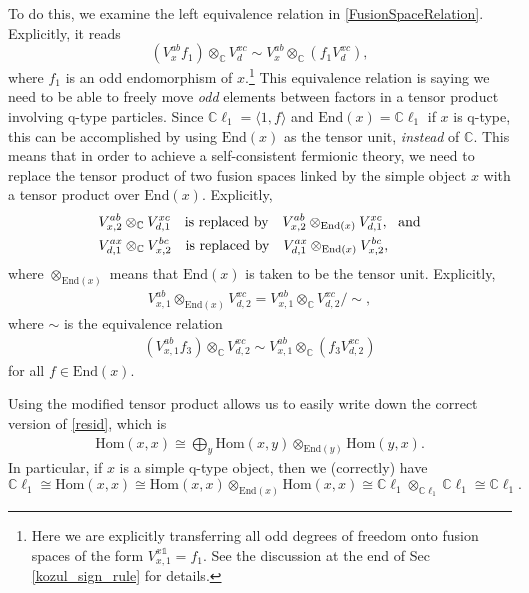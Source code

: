 \documentclass[12pt,a4paper]{article}
\newcommand{\tp}{\otimes}
\newcommand{\unit}{\mathds{1}}
\newcommand{\cc}{\mathbb{C}}
\newcommand\be            {\begin{equation}}
\newcommand\ee            {\end{equation}}
\newcommand\ba            {\begin{aligned}}
\newcommand\ea            {\end{aligned}}
\newcommand{\Hom}{\text{Hom}}
\newcommand{\End}{\text{End}}
\newcommand{\cl}{\mathbb{C}\ell}
\begin{document}
To do this, we examine the left equivalence relation in \eqref{FusionSpaceRelation}. 
Explicitly, it reads
\be (V^{ab}_x f_1) \tp_\cc V^{xc}_d \sim V^{ab}_x \tp_\cc (f_1 V^{xc}_d),\ee
where $f_1$ is an odd endomorphism of $x$.\footnote{Here we are explicitly transferring all odd degrees of freedom onto fusion spaces of the form $V^{x\unit}_{x,1} = f_1$. See the discussion at the end of Sec \ref{kozul_sign_rule} for details.}
This equivalence relation is saying we need to be able to freely move {\it odd} elements between factors in a tensor product involving q-type particles. 
Since $\cl_1 = \langle1,f\rangle$ and $\End(x) = \cl_1$ if $x$ is q-type, this can be accomplished by using $\End(x)$ as the tensor unit, {\it instead} of $\cc$. 
This means that in order to achieve a self-consistent fermionic theory, we need to replace the tensor product of two fusion spaces linked by the simple object $x$ with a tensor product over $\End(x)$. 
 Explicitly, 
\be \ba
 &V^{ab}_{x,2} \tp_{\mathbb{C}} V^{xc}_{d,1}\quad  \text{is replaced by} \quad V^{ab}_{x,2} \tp_{\text{End}(x)} V^{xc}_{d,1},\ \  {\rm and} \\ 
  &V^{ax}_{d,1} \tp_{\mathbb{C}} V^{bc}_{x,2}\quad  \text{is replaced by} \quad V^{ax}_{d,1} \tp_{\End(x)} V^{bc}_{x,2},
\ea 
\ee
where $\tp_{\End(x)}$ means that $\End(x)$ is taken to be the tensor unit. Explicitly, %
\begin{align}
V^{ab}_{x,1} \tp_{\text{End}(x)} V^{xc}_{d,2} = V^{ab}_{x,1} \tp_{\mathbb{C}}V^{xc}_{d,2}/ \sim,
\label{qtensor}
\end{align}
where $\sim$ is the equivalence relation 
\begin{align} \label{equivreln}
(V^{ab}_{x,1} f_3) \tp_{\mathbb{C}}V^{xc}_{d,2} \sim V^{ab}_{x,1} \tp_{\mathbb{C}} (f_3 V^{xc}_{d,2})
\end{align}
for all $f \in \text{End}(x)$. 

Using the modified tensor product allows us to easily write down the correct version of \eqref{resid}, which is 
\begin{align}
\Hom(x,x) \cong \bigoplus_y \Hom(x,y) \tp_{\End(y)} \Hom(y,x).
\end{align}
In particular, if $x$ is a simple q-type object, then we (correctly) have \be
\cl_1 \cong \Hom(x,x) \cong \Hom(x,x)\tp_{\End(x)} \Hom(x,x) \cong \cl_1\tp_{\cl_1}\cl_1 \cong \cl_1.\ee  
\end{document}
